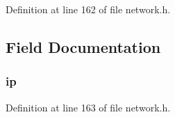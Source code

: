 Definition at line 162 of file network.\+h.



\subsection{Field Documentation}
\hypertarget{struct_i_p___port_a0c6193a337a223c63411b2fe722d79ec}{
\subsubsection[{ip}]{ ip}}\label{struct_i_p___port_a0c6193a337a223c63411b2fe722d79ec}


Definition at line 163 of file network.\+h.




